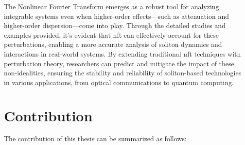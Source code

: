 The Nonlinear Fourier Transform emerges as a robust tool for analyzing integrable systems even when higher-order effects—such as attenuation and higher-order dispersion—come into play. Through the detailed studies and examples provided, it's evident that \acrshort{nft} can effectively account for these perturbations, enabling a more accurate analysis of soliton dynamics and interactions in real-world systems. By extending traditional \acrshort{nft} techniques with perturbation theory, researchers can predict and mitigate the impact of these non-idealities, ensuring the stability and reliability of soliton-based technologies in various applications, from optical communications to quantum computing.


\section*{Contribution}
The contribution of this thesis can be summarized as follows:
